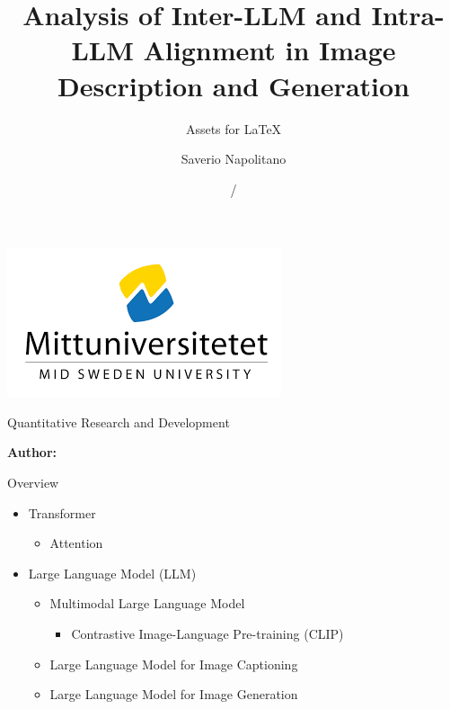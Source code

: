 \documentclass[12pt]{beamer}
\title[Insitute]{Analysis of Inter-LLM and Intra-LLM Alignment in Image Description and Generation}
\subtitle{Assets for \LaTeX}
\author[Name Surname]{Saverio Napolitano}
\institute[]{Mid Sweden University}
\date{\currentyear/\nextyear} %
\newcommand{\course}{Quantitative Research and Development}
\begin{document}
\begin{frame}{}

\includegraphics[width=0.16\linewidth]{figures/logo.png}

\vspace{\fill}

\Large
\color{main}
\inserttitle

\medskip

\large
\color{black}

\vspace{\fill}

\footnotesize
\insertinstitute

\footnotesize
\course


\vspace{\fill}

\textbf{Author:} \insertauthor

\medskip

\insertdate

\vspace{\fill}
\end{frame}

\begin{frame}[allowframebreaks]{Overview}
\begin{itemize}
    \item Transformer 
    \begin{itemize}
        \item Attention
    \end{itemize} 
    \item Large Language Model (LLM)
    \begin{itemize}
        \item Multimodal Large Language Model 
        \begin{itemize} 
            \item Contrastive Image-Language Pre-training (CLIP)
        \end{itemize}
        \item Large Language Model for Image Captioning 
        \item Large Language Model for Image Generation 
    \end{itemize}
\end{itemize}
\end{frame} 
\end{document}
